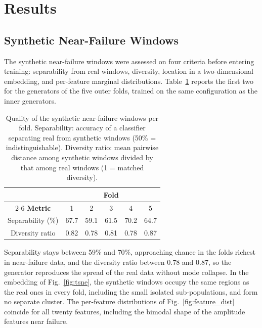 \documentclass[review]{elsarticle}
\begin{document}
\section{Results}
\label{sec:results}

\subsection{Synthetic Near-Failure Windows}
\label{sec:res_gan}

The synthetic near-failure windows were assessed on four criteria
before entering training: separability from real windows, diversity,
location in a two-dimensional embedding, and per-feature marginal
distributions. Table~\ref{tab:gan_quality} reports the first two for
the generators of the five outer folds, trained on the same
configuration as the inner generators.

\begin{table}[htbp]
\centering
\caption{Quality of the synthetic near-failure windows per fold.
Separability: accuracy of a classifier separating real from synthetic
windows (50\% = indistinguishable). Diversity ratio: mean pairwise
distance among synthetic windows divided by that among real windows
(1 = matched diversity).}
\label{tab:gan_quality}
\footnotesize
\renewcommand{\arraystretch}{1.2}
\begin{tabular}{cccccc}
\toprule
& \multicolumn{5}{c}{\textbf{Fold}} \\
\cmidrule(lr){2-6}
\textbf{Metric} & 1 & 2 & 3 & 4 & 5 \\
\midrule
Separability (\%) & 67.7 & 59.1 & 61.5 & 70.2 & 64.7 \\
Diversity ratio   & 0.82 & 0.78 & 0.81 & 0.78 & 0.87 \\
\bottomrule
\end{tabular}
\end{table}

Separability stays between 59\% and 70\%, approaching chance in the
folds richest in near-failure data, and the diversity ratio between
0.78 and 0.87, so the generator reproduces the spread of the real data
without mode collapse. In the embedding of Fig.~\ref{fig:tsne}, the
synthetic windows occupy the same regions as the real ones in every
fold, including the small isolated sub-populations, and form no
separate cluster. The per-feature distributions of
Fig.~\ref{fig:feature_dist} coincide for all twenty features,
including the bimodal shape of the amplitude features near failure.
\end{document}
